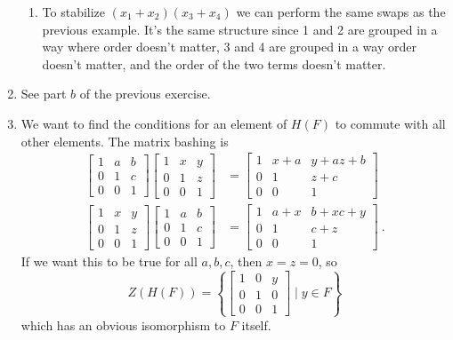 \documentclass[]{article}
\begin{document}
\begin{enumerate}
\begin{enumerate}
\item To stabilize $(x_1 + x_2)(x_3 + x_4)$ we can perform the same swaps as the previous example. It's the same structure since 1 and 2 are grouped in a way where order doesn't matter, 3 and 4 are grouped in a way order doesn't matter, and the order of the two terms doesn't matter.


\end{enumerate}


\item See part $b$ of the previous exercise.


\item We want to find the conditions for an element of $H(F)$ to commute with all other elements. The matrix bashing is
\begin{align}
\begin{bmatrix}1&a&b\\0&1&c\\0&0&1\end{bmatrix}\begin{bmatrix}1&x&y\\0&1&z\\0&0&1\end{bmatrix} &= \begin{bmatrix}1&x+a&y+az+b\\0&1&z+c\\0&0&1\end{bmatrix} \\
\begin{bmatrix}1&x&y\\0&1&z\\0&0&1\end{bmatrix}\begin{bmatrix}1&a&b\\0&1&c\\0&0&1\end{bmatrix} &= \begin{bmatrix}1&a+x&b+xc+y\\0&1&c+z\\0&0&1\end{bmatrix}\ .
\end{align}
If we want this to be true for all $a,b,c$, then $x=z=0$, so 
\begin{equation}
Z(H(F)) = \left\{ \begin{bmatrix}1&0&y\\0&1&0\\0&0&1\end{bmatrix}\mid y \in F \right\}
\end{equation}
which has an obvious isomorphism to $F$ itself.

\end{enumerate}
\end{document}
